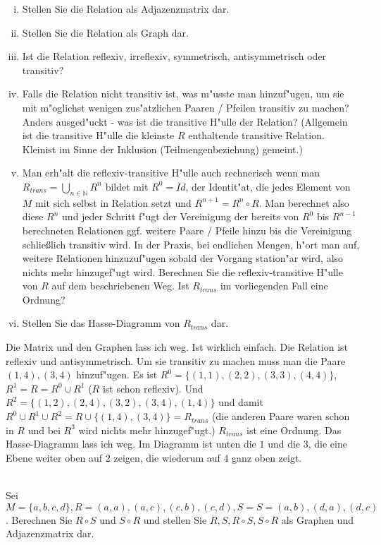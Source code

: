 \begin{enumerate}[(i)]
\item Stellen Sie die Relation als Adjazenzmatrix dar.
\item Stellen Sie die Relation als Graph dar.
\item Ist die Relation reflexiv, irreflexiv, symmetrisch, antisymmetrisch oder transitiv?
\item Falls die Relation nicht transitiv ist, was m"usste man hinzuf"ugen, um sie mit m"oglichst wenigen zus"atzlichen Paaren / Pfeilen transitiv zu machen? Anders ausged"uckt - was ist die transitive H"ulle der Relation? (Allgemein ist die transitive H"ulle die kleinste $R$ enthaltende transitive Relation. \glqq Klein\grqq ist im Sinne der Inklusion (Teilmengenbeziehung) gemeint.)
\item Man erh"alt die reflexiv-transitive H"ulle auch rechnerisch wenn man $R_{trans}=\bigcup_{n\in\mathbb{N}}R^n$ bildet mit $R^0=Id$, der Identit"at, die jedes Element von $M$ mit sich selbst in Relation setzt und $R^{n+1}=R^n\circ R$. Man berechnet also diese $R^n$ und jeder Schritt f"ugt der Vereinigung der bereits von $R^0$ bis $R^{n-1}$ berechneten Relationen ggf. weitere Paare / Pfeile hinzu bis die Vereinigung schlie\ss lich transitiv wird. In der Praxis, bei endlichen Mengen, h"ort man auf, weitere Relationen hinzuzuf"ugen sobald der Vorgang station"ar wird, also nichts mehr hinzugef"ugt wird. Berechnen Sie die reflexiv-transitive H"ulle von $R$ auf dem beschriebenen Weg. Ist $R_{trans}$ im vorliegenden Fall eine Ordnung?
\item Stellen Sie das Hasse-Diagramm von $R_{trans}$ dar. 
\end{enumerate}

\begin{loesung}
Die Matrix und den Graphen lass ich weg. Ist wirklich einfach.
Die Relation ist reflexiv und antisymmetrisch.
Um sie transitiv zu machen muss man die Paare $(1,4),(3,4)$ hinzuf"ugen.
Es ist $R^0=\{(1,1),(2,2),(3,3),(4,4)\}$, $R^1=R=R^0\cup R^1$ ($R$ ist schon reflexiv). Und $R^2=\{(1,2),(2,4),(3,2),(3,4),(1,4)\}$ und damit $R^0\cup R^1\cup R^2=R\cup\{(1,4),(3,4)\}=R_{trans}$ (die anderen Paare waren schon in $R$ und bei $R^3$ wird nichts mehr hinzugef"ugt.)
$R_{trans}$ ist eine Ordnung. Das Hasse-Diagramm lass ich weg. Im Diagramm ist unten die $1$ und die $3$, die eine Ebene weiter oben auf $2$ zeigen, die wiederum auf $4$ ganz oben zeigt.
\end{loesung}

\\
Sei $M=\{a,b,c,d\}, R={(a,a),(a,c),(c,b),(c,d)}, S=S={(a,b),(d,a),(d,c)}$. Berechnen Sie $R\circ S$ und $S\circ R$ und stellen Sie $R, S, R\circ S, S\circ R$ als Graphen und Adjazenzmatrix dar.


